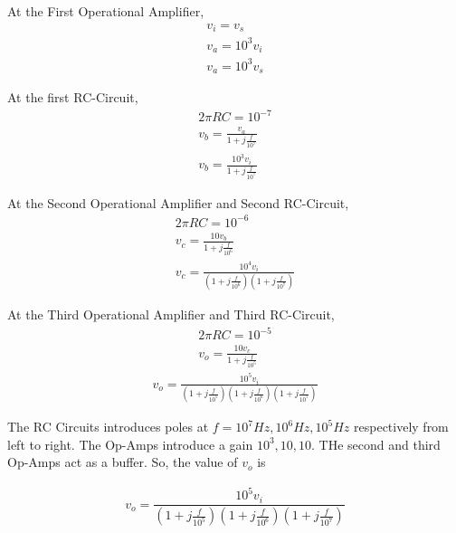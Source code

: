\begin{enumerate}[label=\thesection.\arabic*.,ref=\thesection.\theenumi]
At the First Operational Amplifier,
\begin{align}
v_{i} = v_{s}\\
v_{a} = 10^3 v_{i}\\
v_{a} = 10^3 v_{s}
\end{align}

At the first RC-Circuit,
\begin{align}
2\pi RC = 10^{-7}\\
v_{b} = \frac{v_{a}}{1 + j\frac{f}{10^{7}}}\\
v_{b} = \frac{10^3 v_{i}}{1 + j\frac{f}{10^{7}}}
\end{align}

At the Second Operational Amplifier and Second RC-Circuit,
\begin{align}
2\pi RC = 10^{-6}\\
v_{c} = \frac{10v_{b}}{1 + j\frac{f}{10^{6}}}\\
v_{c} = \frac{10^4 v_{i}}{(1 + j\frac{f}{10^{6}})(1 + j\frac{f}{10^{7}})}
\end{align}

At the Third Operational Amplifier and Third RC-Circuit,
\begin{align}
2\pi RC = 10^{-5}\\
v_{o} = \frac{10v_{c}}{1 + j\frac{f}{10^{5}}}
\end{align}
\begin{align}
v_{o} = \frac{10^5 v_{i}}{(1 + j\frac{f}{10^{5}})(1 + j\frac{f}{10^{6}})(1 + j\frac{f}{10^{7}})}
\end{align}

The RC Circuits introduces poles at $f=10^{7} Hz, 10^{6} Hz, 10^{5} Hz$ respectively from left to right. The Op-Amps introduce a gain  $10^{3},10,10$. THe second and third Op-Amps act as a buffer. So, the value of $v_{o}$ is

\begin{align}
v_{o} = \dfrac{10^5 v_{i}}{\left(1+j\frac{f}{10^{5}}\right)\left(1+j\frac{f}{10^{6}}\right)\left(1+j\frac{f}{10^{7}}\right)}
\end{align}


\end{enumerate}
